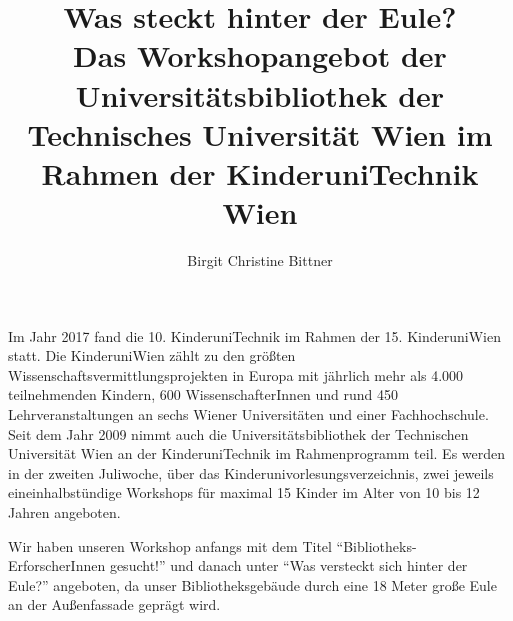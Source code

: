 \documentclass[a4paper,
fontsize=11pt,
oneside,
numbers=noperiodatend,
parskip=half-,
bibliography=totoc,
final
]{scrartcl}
\title{\LARGE{Was steckt hinter der Eule?\\ Das Workshopangebot der Universitätsbibliothek der Technisches Universität Wien im Rahmen der KinderuniTechnik Wien}} %
\author{Birgit Christine Bittner} %
\date{}
\begin{document}
\maketitle
\thispagestyle{fancyplain} 


Im Jahr 2017 fand die 10. KinderuniTechnik im Rahmen der 15.
KinderuniWien statt. Die KinderuniWien zählt zu den größten
Wissenschaftsvermittlungsprojekten in Europa mit jährlich mehr als 4.000
teilnehmenden Kindern, 600 WissenschafterInnen und rund 450
Lehrveranstaltungen an sechs Wiener Universitäten und einer
Fachhochschule. Seit dem Jahr 2009 nimmt auch die Universitätsbibliothek
der Technischen Universität Wien an der KinderuniTechnik im
Rahmenprogramm teil. Es werden in der zweiten Juliwoche, über das
Kinderunivorlesungsverzeichnis, zwei jeweils eineinhalbstündige
Workshops für maximal 15 Kinder im Alter von 10 bis 12 Jahren angeboten.

Wir haben unseren Workshop anfangs mit dem Titel
\enquote{Bibliotheks-ErforscherInnen gesucht!} und danach unter
\enquote{Was versteckt sich hinter der Eule?} angeboten, da unser
Bibliotheksgebäude durch eine 18 Meter große Eule an der Außenfassade
geprägt wird.
\end{document}
